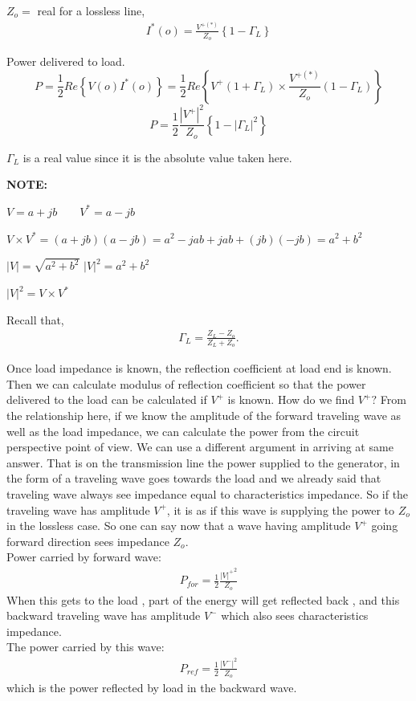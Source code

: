 $Z_o= $ real for a lossless line,
\begin{align*}
I^\ast (o) =\frac{V^{+ (\ast )}}{Z_o}\left\lbrace 1 -\Gamma_L \right\rbrace
\end{align*}

Power delivered to load.
\begin{dmath*}
P= \frac{1}{2} Re\left\lbrace V(o) I^*(o) \right\rbrace = \frac{1}{2} Re\left\lbrace V^+(1+\Gamma_L) \times \frac{V^{+(*)}}{Z_o} (1-\Gamma_L)\right\rbrace
\end{dmath*}
\begin{equation}
P= \frac{1}{2} \frac{|V^+|^2}{Z_o} \left\lbrace 1 -|\Gamma_L|^2 \right\rbrace 
\end{equation}

$\Gamma_L$ is a real value since it is the absolute value taken here.

\textbf{NOTE:} 

$V= a + jb  \quad \quad V^*= a -jb$

$ V\times V^* = ( a + jb)(a-jb)= a^2 - jab + jab + (jb) (-jb)= a^2 + b^2 $

$| V |= \sqrt{a^2 + b^2} $ \quad \quad $|V|^2 = a^2 + b^2 $

$| V |^2 = V \times V^* $ 

Recall that,
\begin{align*}\Gamma_L = \frac{ Z_L -Z_o }{ Z_L + Z_o }.
\end{align*}

Once load impedance is known, the reflection coefficient at load end is known. Then we can calculate modulus of reflection coefficient so that the power delivered to the load can be calculated if $V^+$ is known. How do we find $V^+ ? $ From the relationship here, if we know the amplitude of the forward traveling wave as well as the load impedance, we can calculate the power from the circuit perspective point of view. We can use a different argument in arriving at same answer. That is on the transmission line the power supplied to the generator, in the form of a traveling wave goes towards the load and we already said that traveling wave always see impedance equal to characteristics impedance. So if the traveling wave has amplitude $V^+$, it is as if this wave is supplying the power to $Z_o$ in the lossless case. So one can say now that  a wave having amplitude $V^+$ going forward direction sees impedance $Z_o$.\\
Power carried by forward wave:  
\begin{align*}
P_{for}= \frac{1}{2} \frac{{| V |^+}^2}{Z_o}
\end{align*}
When this gets to the load , part of the energy will get reflected back , and this backward traveling wave has amplitude $V^-$ which also sees characteristics impedance.\\
The power carried by this wave:
\begin{align*}
P_{ref}= \frac{1}{2}\frac{{|V^-|}^2}{Z_o}
\end{align*}
which is the power reflected by load in the backward wave.

